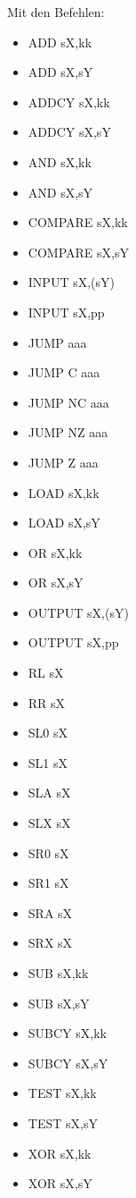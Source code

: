 \documentclass{scrartcl}
\begin{document}
Mit den Befehlen:
\begin{multicols}{3}
\begin{itemize}
    \item ADD sX,kk
    \item ADD sX,sY
    \item ADDCY sX,kk
    \item ADDCY sX,sY
    \item AND sX,kk
    \item AND sX,sY
    \item COMPARE sX,kk
    \item COMPARE sX,sY
    \item INPUT sX,(sY)
    \item INPUT sX,pp
    \item JUMP aaa
    \item JUMP C aaa
    \item JUMP NC aaa
    \item JUMP NZ aaa
    \item JUMP Z aaa
    \item LOAD sX,kk
    \item LOAD sX,sY
    \item OR sX,kk
    \item OR sX,sY
    \item OUTPUT sX,(sY)
    \item OUTPUT sX,pp
    \item RL sX
    \item RR sX
    \item SL0 sX
    \item SL1 sX
    \item SLA sX
    \item SLX sX
    \item SR0 sX
    \item SR1 sX
    \item SRA sX
    \item SRX sX
    \item SUB sX,kk
    \item SUB sX,sY
    \item SUBCY sX,kk
    \item SUBCY sX,sY
    \item TEST sX,kk
    \item TEST sX,sY
    \item XOR sX,kk
    \item XOR sX,sY
\end{itemize}
\end{multicols}
\end{document}
